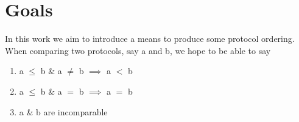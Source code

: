 \section{Goals}

In this work we aim to introduce a means to produce some protocol ordering. When comparing two protocols, say a and b, we hope to be able to say 

\begin{enumerate}
    \item a $\leq$ b \& a $\neq$ b $\implies$ a $<$ b
    \item a $\leq$ b \& a $=$ b $\implies$ a $=$ b
    \item a \& b are incomparable  
\end{enumerate}

